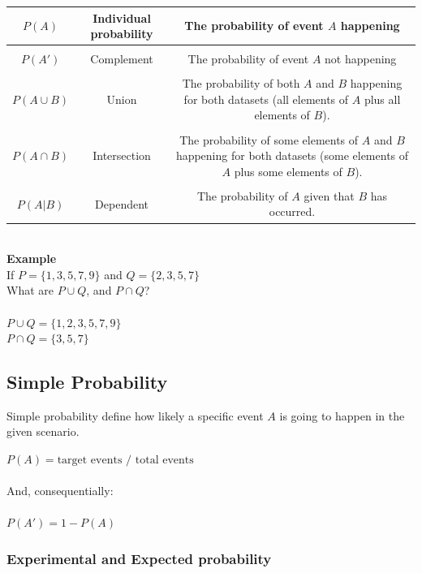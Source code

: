 \documentclass{article}
\begin{document}
\begin{center}
\begin{tabular}{|c|c|c|}
\hline
$P(A)$ & Individual probability & The probability of event $A$ happening \\ \hline
&&\\[-1em]
$P(A')$ & Complement & The probability of event $A$ not happening \\ \hline
&&\\[-1em]
$P(A \cup B)$ & Union & \makecell{The probability of both $A$ and $B$ happening for both datasets \\ (all elements of $A$ plus all elements of $B$).} \\ \hline
&&\\[-1em]
$P(A \cap B)$ & Intersection & \makecell{The probability of some elements of $A$ and $B$ happening for both datasets \\ (some elements of $A$ plus some elements of $B$).} \\ \hline
&&\\[-1em]
$P(A | B)$ & Dependent & The probability of $A$ given that $B$ has occurred. \\
\hline
\end{tabular}
\end{center}

\mbox{} \\

\textbf{Example}\\ 
If $P = \{1,3,5,7,9\}$ and $Q = \{2,3,5,7\}$ \\
What are $P \cup Q$, and $P \cap  Q$? \\ 
\mbox{} \\
$P \cup Q = \{1,2,3,5,7,9\}$ \\ 
$P \cap Q = \{3,5,7\}$ \\

\subsection{Simple Probability}
Simple probability define how likely a specific event $A$ is going to happen in the given scenario. 

$P(A) = \text{target events / total events}$ \\
\mbox{} \\
And, consequentially: \\
\mbox{} \\
$P(A') = 1 - P(A)$

\subsubsection{Experimental and Expected probability}
\end{document}

